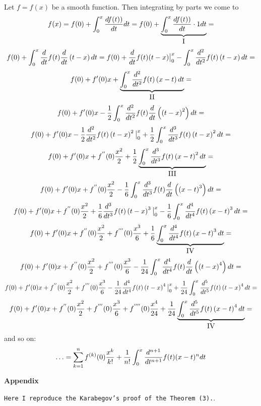    Let $f=f(x)$ be a smooth function. Then
          integrating by parts we come to
                $$
f(x)=
f(0)+\int_0^x {d f(t))\over dt}dt=
f(0)+\underbrace{\int_0^x {d f(t))\over dt}\cdot 1 dt}
        _{\hbox{I}}=
         $$
          $$
f(0)+\int_0^x {d\over dt} f(t){d\over dt}\left(t-x\right)dt=
f(0)+{d\over dt} f(t)(t-x)\big\vert^x_0-
   \int_0^x {d^2\over dt^2} f(t)\left(t-x\right)dt=
            $$
           $$
f(0)+f'(0)x+
   \underbrace
            {
 \int_0^x {d^2\over dt^2} f(t)\left(x-t\right)dt
           }_{\hbox{II}}=
            $$
            $$
f(0)+f'(0)x-    {1\over2}\int_0^x {d^2\over dt^2} f(t)
    {d\over dt}\left(\left(t-x\right)^2\right)dt
           =
           $$
        $$
f(0)+f'(0)x
-   {1\over 2} {d^2\over dt^2} f(t)
    \left(t-x\right)^2\big\vert^x_0
   +
   {1\over 2}\int_0^x {d^3\over dt^3} f(t)
    \left(t-x\right)^2 dt=
          $$
            $$
f(0)+f'(0)x
+f^{''}(0) {x^2\over 2}  
   +
             {1\over 2}
      \underbrace
         {
\int_0^x {d^3\over dt^3} f(t)
    \left(x-t\right)^2 dt
        }_{\hbox{III}}=
          $$
          $$
f(0)+f'(0)x
+f^{''}(0){x^2\over 2}
-    {1\over 6 }\int_0^x {d^3\over dt^3} f(t)
    {d\over dt}\left(\left(x-t\right)^3\right)dt
           =
          $$
            $$
f(0)+f'(0)x
+f^{''}(0){x^2\over 2}
+   {1\over 6} {d^3\over dt^3} f(t)
    \left(t-x\right)^3\big\vert^x_0
   -
   {1\over 6}\int_0^x {d^4\over dt^4} f(t)
    \left(x-t\right)^3 dt=
          $$
            $$
f(0)+f'(0)x
+f^{''}(0) {x^2\over 2}  
+f^{'''}(0) {x^3\over 6}  
   +
             {1\over 6}
      \underbrace
         {
\int_0^x {d^4\over dt^4} f(t)
    \left(x-t\right)^3 dt
        }_{\hbox{IV}}=
          $$
           $$
f(0)+f'(0)x
+f^{''}(0){x^2\over 2}
+f^{'''}(0){x^3\over 6}
-    {1\over 24 }\int_0^x {d^4\over dt^4} f(t)
    {d\over dt}\left(\left(t-x\right)^4\right)dt
           =
          $$
            $$
f(0)+f'(0)x
+f^{''}(0){x^2\over 2}
+f^{'''}(0){x^3\over 6}
-   {1\over 24} {d^4\over dt^4} f(t)
    \left(t-x\right)^4\big\vert^x_0
   +
   {1\over 24}\int_0^x {d^5\over dt^5} f(t)
    \left(t-x\right)^4 dt=
          $$
            $$
f(0)+f'(0)x
+f^{''}(0) {x^2\over 2}  
+f^{'''}(0) {x^3\over 6}  
+f^{''''}(0) {x^4\over 24}  
   +
             {1\over 24}
      \underbrace
         {
\int_0^x {d^5\over dt^5} f(t)
    \left(x-t\right)^4 dt
        }_{\hbox{IV}}=
          $$
and so on:
          $$
\ldots=\sum_{k=1}^n f^{(k)}(0){x^k\over k!}+
         {1\over n!}\int_0^x 
{d^{n+1}\over dt^{n+1}}f(t)(x-t)^ndt
          $$

\bigskip


\centerline {\bf Appendix }
{\tt Here I reproduce the Karabegov's proof
of the Theorem (3).}.

